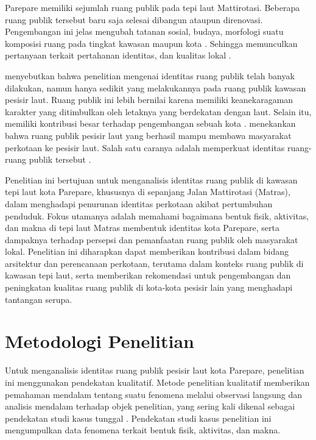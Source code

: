 \documentclass[11pt]{simart} %
\begin{document}
Parepare memiliki sejumlah ruang publik pada tepi laut Mattirotasi. Beberapa ruang publik tersebut baru saja selesai dibangun ataupun direnovasi. Pengembangan ini jelas mengubah tatanan sosial, budaya, morfologi suatu komposisi ruang pada tingkat kawasan maupun kota \citep{kaymaz2013,oktay2002}. Sehingga memunculkan pertanyaan terkait pertahanan identitas, dan kualitas lokal \citep{kaymaz2013}.

\cite{oktay2015} menyebutkan bahwa penelitian mengenai identitas ruang publik telah banyak dilakukan, namun hanya sedikit yang melakukannya pada ruang publik kawasan pesisir laut. Ruang publik ini lebih bernilai karena memiliki keanekaragaman karakter yang ditimbulkan oleh letaknya yang berdekatan dengan laut. Selain itu, memiliki kontribusi besar terhadap pengembangan sebuah kota \citep{hussein2014}. \cite{hussein2014} menekankan bahwa ruang publik pesisir laut yang berhasil mampu membawa masyarakat perkotaan ke pesisir laut. Salah satu caranya adalah memperkuat identitas ruang-ruang publik tersebut \citep{oktay2002}.

Penelitian ini bertujuan untuk menganalisis identitas ruang publik di kawasan tepi laut kota Parepare, khususnya di sepanjang Jalan Mattirotasi (Matras), dalam menghadapi penurunan identitas perkotaan akibat pertumbuhan penduduk. Fokus utamanya adalah memahami bagaimana bentuk fisik, aktivitas, dan makna di tepi laut Matras membentuk identitas kota Parepare, serta dampaknya terhadap persepsi dan pemanfaatan ruang publik oleh masyarakat lokal. Penelitian ini diharapkan dapat memberikan kontribusi dalam bidang arsitektur dan perencanaan perkotaan, terutama dalam konteks ruang publik di kawasan tepi laut, serta memberikan rekomendasi untuk pengembangan dan peningkatan kualitas ruang publik di kota-kota pesisir lain yang menghadapi tantangan serupa.

% 

\section{Metodologi Penelitian}
Untuk menganalisis identitas ruang publik pesisir laut kota Parepare, penelitian ini menggunakan pendekatan kualitatif. Metode penelitian kualitatif memberikan pemahaman mendalam tentang suatu fenomena melalui observasi langsung dan analisis mendalam terhadap objek penelitian, yang sering kali dikenal sebagai pendekatan studi kasus tunggal \citep{creswell2016}. Pendekatan studi kasus penelitian ini mengumpulkan data fenomena terkait bentuk fisik, aktivitas, dan makna.
\end{document}
